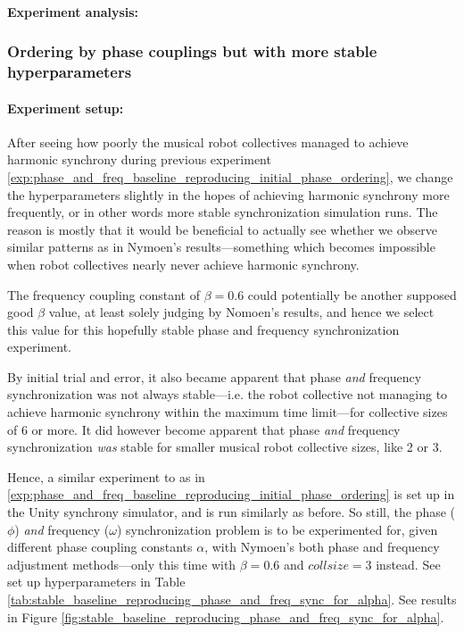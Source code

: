 			\paragraph{Experiment analysis:\nl}
		
		
		\subsubsection{Ordering by phase couplings but with more stable hyperparameters}
		
			\paragraph{Experiment setup:\nl}
			
			After seeing how poorly the musical robot collectives managed to achieve harmonic synchrony during previous experiment \ref{exp:phase_and_freq_baseline_reproducing_initial_phase_ordering}, we change the hyperparameters slightly in the hopes of achieving harmonic synchrony more frequently, or in other words more stable synchronization simulation runs. The reason is mostly that it would be beneficial to actually see whether we observe similar patterns as in Nymoen's results—something which becomes impossible when robot collectives nearly never achieve harmonic synchrony.
			
			The frequency coupling constant of $\beta=0.6$ could potentially be another supposed good $\beta$ value, at least solely judging by Nomoen's results, and hence we select this value for this hopefully stable phase and frequency synchronization experiment.
			
			By initial trial and error, it also became apparent that phase \textit{and} frequency synchronization was not always stable—i.e. the robot collective not managing to achieve harmonic synchrony within the maximum time limit—for collective sizes of 6 or more. It did however become apparent that phase \textit{and} frequency synchronization \textit{was} stable for smaller musical robot collective sizes, like 2 or 3.
			
			Hence, a similar experiment to as in \ref{exp:phase_and_freq_baseline_reproducing_initial_phase_ordering} is set up in the Unity synchrony simulator, and is run similarly as before. So still, the phase ($\phi$) \textit{and} frequency ($\omega$) synchronization problem is to be experimented for, given different phase coupling constants $\alpha$, with Nymoen's both phase and frequency adjustment methods—only this time with $\beta=0.6$ and $collsize=3$ instead. See set up hyperparameters in Table \ref{tab:stable_baseline_reproducing_phase_and_freq_sync_for_alpha}. See results in Figure \ref{fig:stable_baseline_reproducing_phase_and_freq_sync_for_alpha}.
			
